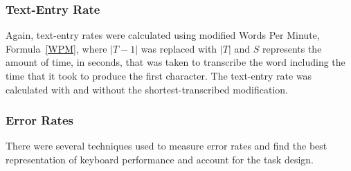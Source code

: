 \begin{table}[h] %
	\centering
	\caption[Backspace-transcribed Examples]{\centering Examples of the backspace-transcribed modification.}
	\label{backspace_presented}
\end{table}

\subsubsection{Text-Entry Rate}
Again, text-entry rates were calculated using modified Words Per Minute, Formula~\ref{WPM}, where $|T-1|$ was replaced with $|T|$ and $S$ represents the amount of time, in seconds, that was taken to transcribe the word including the time that it took to produce the first character. The text-entry rate was calculated with and without the shortest-transcribed modification.

\subsubsection{Error Rates}
There were several techniques used to measure error rates and find the best representation of keyboard performance and account for the task design.

